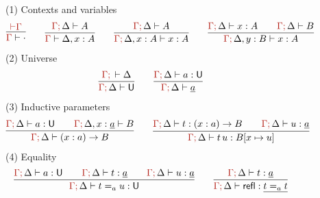 \documentclass[a4paper,UKenglish]{lipics-v2018}
\newcommand{\U}{\mathsf{U}}
\newcommand{\ra}{\rightarrow}
\newcommand{\refl}{\mathsf{refl}}
\newcommand{\1}{\mathsf{1}} \renewcommand{\Pr}{\mathsf{Pr}}
\renewcommand{\hat}[1]{{\color{BrickRed}{#1}}}
\newcommand{\vdashh}{\mathbin{\hat\vdash}}
\newcommand{\semicol}{\hat;\,}
\newcommand{\targetass}{\hat{\Gamma}\semicol}
\begin{document}
\begin{figure}
(1) Contexts and variables
\[
\begin{gathered}
  \infer{\hat{\Gamma}\vdash\cdot}{\vdashh\hat{\Gamma}}
\end{gathered}
\hspace{2em}
\begin{gathered}
  \infer{\hat{\Gamma}\vdash\Delta,x:A}{\targetass\Delta\vdash A}
\end{gathered}
\hspace{2em}
\begin{gathered}
  \infer{\targetass\Delta,x:A\vdash x : A}{\targetass\Delta\vdash A}
\end{gathered}
\hspace{2em}
\begin{gathered}
  \infer{\targetass\Delta,y:B\vdash x : A}{\targetass\Delta\vdash x : A && \targetass\Delta\vdash B}
\end{gathered}
\]
(2) Universe
\[
\begin{gathered}
  \infer{\targetass\Delta \vdash \U}{\targetass\vdash\Delta}
\end{gathered}
\hspace{2em}
\begin{gathered}
  \infer{\targetass\Delta \vdash \underline{a}}{\targetass\Delta \vdash a : \U}
\end{gathered}
\]
(3) Inductive parameters
\[
\begin{gathered}
  \infer{\targetass\Delta \vdash (x:a)\ra B}{\targetass\Delta \vdash a : \U && \targetass\Delta,x:\underline{a} \vdash B}
\end{gathered}
\hspace{2em}
\begin{gathered}
  \infer{\targetass\Delta \vdash t\, u : B[x \mapsto u]}{\targetass\Delta \vdash t : (x:a)\ra B && \targetass\Delta \vdash u : \underline{a}}
\end{gathered}
\]
(4) Equality
\[
\begin{gathered}
  \infer{\targetass\Delta \vdash t=_a u : \U}{\targetass\Delta \vdash a : \U && \targetass\Delta \vdash t : \underline{a} && \targetass\Delta \vdash u : \underline{a}}
\end{gathered}
\hspace{2em}
\begin{gathered}
  \infer{\targetass\Delta \vdash \refl : \underline{t=_a t}}{\targetass\Delta \vdash t : \underline{a}}
\end{gathered}
\]


\end{figure}
\end{document}
